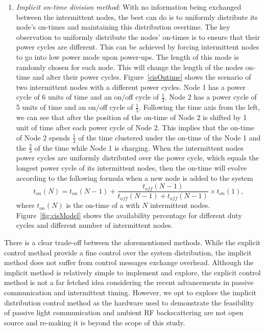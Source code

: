 \begin{enumerate}
		\item \textit{Implicit on-time division method}: With no information being exchanged between the intermittent nodes, the best \sys can do is to uniformly distribute its node's on-times and maintaining this distribution overtime. The key observation to uniformly distribute the nodes' on-times is to ensure that their power cycles are different. This can be achieved by forcing intermittent nodes to go into low power mode upon power-ups. The length of this mode is randomly chosen for each node. This will change the length of the nodes on-time and alter their power cycles. Figure~\ref{cisOntime} shows the scenario of two intermittent nodes with a different power cycles. Node 1 has a power cycle of 6 units of time and an on/off cycle of $\frac{1}{3}$. Node 2 has a power cycle of 5 units of time and an on/off cycle of $\frac{1}{5}$. Following the time axis from the left, we can see that after the position of the on-time of Node 2 is shifted by 1 unit of time after each power cycle of Node 2. This implies that the on-time of Node 2 spends $\frac{1}{3}$ of the time clustered under the on-time of the Node 1 and the $\frac{2}{3}$ of the time while Node 1 is charging. When the intermittent nodes power cycles are uniformly distributed over the \sys power cycle, which equals the longest power cycle of its intermittent nodes, then the \sys on-time will evolve according to the following formula when a new node is added to the system
\begin{equation}
	t_{on}(N) = t_{on}(N-1) + \frac{t_{off}(N-1)}{t_{off}(N-1)+t_{off}(N-1)} \times t_{on}(1),
		\label{eq:cisModel}
\end{equation}
				where $t_{on}(N)$ is the on-time of a \sys with $N$ intermittent nodes. Figure~\ref{fig:cisModel} shows the \sys availability percentage for different duty cycles and different number of intermittent nodes.
\end{enumerate}
There is a clear trade-off between the aforementioned methods. While the explicit control method provide a fine control over the system distribution, the implicit method does not suffer from control messages exchange overhead. Although the implicit method is relatively simple to implement and explore, the explicit control method is not a far fetched idea considering the recent advancements in passive communication and intermittent timing. However, we opt to explore the implicit distribution control method as the hardware used to demonstrate the feasibility of passive light communication and ambient RF backscattering are not open source and re-making it is beyond the scope of this study.

